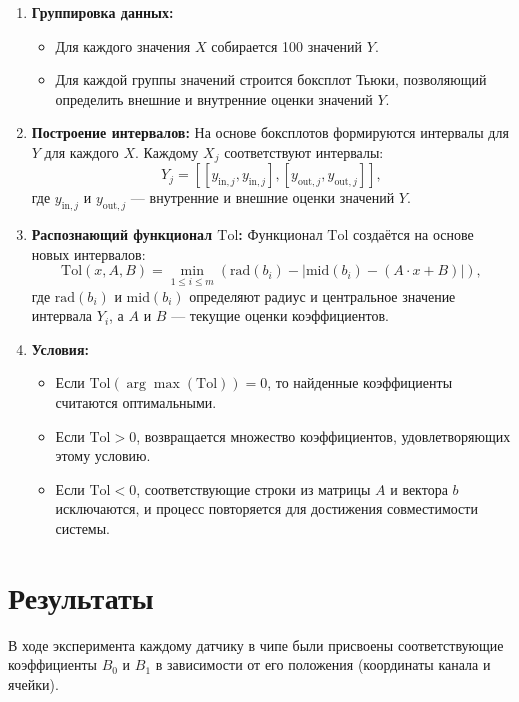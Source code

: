 \documentclass[a4paper,14pt]{extarticle}
\begin{document}
\begin{enumerate}
    \item \textbf{Группировка данных:}
    \begin{itemize}
        \item Для каждого значения $ X $ собирается 100 значений $ Y $.
        \item Для каждой группы значений строится боксплот Тьюки, позволяющий определить внешние и внутренние оценки значений $ Y $.
    \end{itemize}
    
    \item \textbf{Построение интервалов:} На основе боксплотов формируются интервалы для $ Y $ для каждого $ X $. Каждому $ X_j $ соответствуют интервалы:
    $$
    Y_j = \left[ [y_{\text{in}, j}, y_{\text{in}, j}], [y_{\text{out}, j}, y_{\text{out}, j}] \right],
    $$
    где $ y_{\text{in}, j} $ и $ y_{\text{out}, j} $ — внутренние и внешние оценки значений $ Y $.
    
    \item \textbf{Распознающий функционал $\text{Tol}$:} Функционал $\text{Tol}$ создаётся на основе новых интервалов:
    $$
    \text{Tol}(x, A, B) = \min_{1 \leq i \leq m} \left( \text{rad}(b_i) - \left| \text{mid}(b_i) - \left( A \cdot x + B \right) \right| \right),
    $$
    где $\text{rad}(b_i)$ и $\text{mid}(b_i)$ определяют радиус и центральное значение интервала $ Y_i $, а $ A $ и $ B $ — текущие оценки коэффициентов.
    
    \item \textbf{Условия:}
    \begin{itemize}
        \item Если $\text{Tol}(\arg\max(\text{Tol})) = 0$, то найденные коэффициенты считаются оптимальными.
        \item Если $\text{Tol} > 0$, возвращается множество коэффициентов, удовлетворяющих этому условию.
        \item Если $\text{Tol} < 0$, соответствующие строки из матрицы $ A $ и вектора $ b $ исключаются, и процесс повторяется для достижения совместимости системы.
    \end{itemize}
\end{enumerate}

\section{Результаты}
В ходе эксперимента каждому датчику в чипе были присвоены соответствующие коэффициенты $B_0$ и $B_1$ в зависимости от его положения (координаты канала и ячейки).
\end{document}

